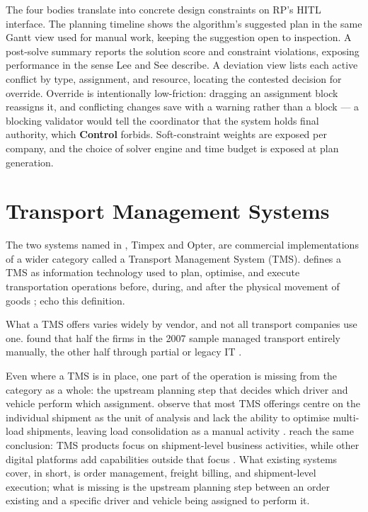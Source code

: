 The four bodies translate into concrete design constraints on RP's HITL interface. The planning timeline shows the algorithm's suggested plan in the same Gantt view used for manual work, keeping the suggestion open to inspection. A post-solve summary reports the solution score and constraint violations, exposing performance in the sense Lee and See describe. A deviation view lists each active conflict by type, assignment, and resource, locating the contested decision for override. Override is intentionally low-friction: dragging an assignment block reassigns it, and conflicting changes save with a warning rather than a block --- a blocking validator would tell the coordinator that the system holds final authority, which \textbf{Control} forbids. Soft-constraint weights are exposed per company, and the choice of solver engine and time budget is exposed at plan generation.


\section{Transport Management Systems}
\label{sec:tms}

The two systems named in , Timpex and Opter, are commercial implementations of a wider category called a Transport Management System (TMS). \textcite{griffis2007tms} defines a TMS as information technology used to plan, optimise, and execute transportation operations before, during, and after the physical movement of goods \parencite[p.~19]{griffis2007tms}; \textcite{heinbach2022datadriven} echo this definition.

What a TMS offers varies widely by vendor, and not all transport companies use one. \textcite{griffis2007tms} found that half the firms in the 2007 sample managed transport entirely manually, the other half through partial or legacy IT \parencite[p.~26]{griffis2007tms}.

Even where a TMS is in place, one part of the operation is missing from the category as a whole: the upstream planning step that decides which driver and vehicle perform which assignment. \textcite{griffis2007tms} observe that most TMS offerings centre on the individual shipment as the unit of analysis and lack the ability to optimise multi-load shipments, leaving load consolidation as a manual activity \parencite[p.~27]{griffis2007tms}. \textcite{heinbach2022datadriven} reach the same conclusion: TMS products focus on shipment-level business activities, while other digital platforms add capabilities outside that focus \parencite[p.~808]{heinbach2022datadriven}. What existing systems cover, in short, is order management, freight billing, and shipment-level execution; what is missing is the upstream planning step between an order existing and a specific driver and vehicle being assigned to perform it.

